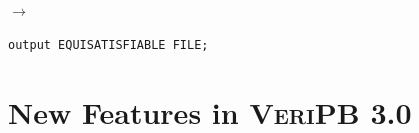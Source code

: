 \documentclass[a4paper]{article}
\newcommand{\veriPB}[0]{\textsc{VeriPB}}
\begin{document}
\begin{itemize}
\begin{minipage}{.47\linewidth}
\begin{lstlisting}[language=veripb, gobble=8, rulecolor=\color{veripb-invalid-text}, caption={\veriPB{} 2.0 syntax.}]
		\end{lstlisting}
	      \end{minipage}\hfill%
	      \begin{minipage}[t]{.05\linewidth}
		      \centering \vspace*{-5mm}$\to$
	      \end{minipage}\hfill%
	      \hfill%
	      \begin{minipage}{.47\linewidth}
		      \begin{lstlisting}[language=veripb, gobble=8, rulecolor=\color{veripb-valid-text}, caption={\veriPB{} 3.0 syntax.}]
		output EQUISATISFIABLE FILE;
		\end{lstlisting}
	      \end{minipage}
\end{itemize}

\section{New Features in \veriPB{} 3.0}\label{sec:new-features}
\end{document}
